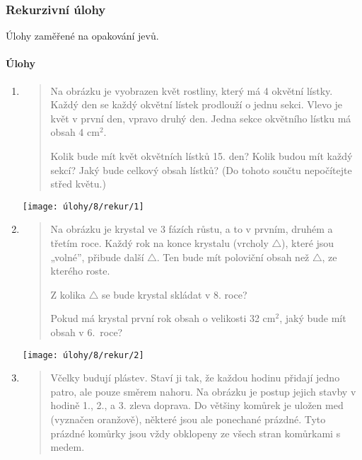 \newpage

\subsubsection{Rekurzivní úlohy}
Úlohy zaměřené na opakování jevů.

\paragraph{Úlohy}
\begin{enumerate}
    \item
    \begin{minipage}[t]{\linewidth}
        \begin{quote}
            Na obrázku je vyobrazen květ rostliny, který má 4 okvětní lístky. Každý den se každý okvětní lístek prodlouží o jednu sekci. Vlevo je květ v první den, vpravo druhý den. Jedna sekce okvětního lístku má obsah 4 cm$^{2}$.

            Kolik bude mít květ okvětních lístků 15. den? Kolik budou mít každý sekcí? Jaký bude celkový obsah lístků? (Do tohoto součtu nepočítejte střed květu.)
        \end{quote}
        \centering
        \texttt{[image: úlohy/8/rekur/1]}
    \end{minipage}

    \item
    \begin{minipage}[t]{\linewidth}
        \begin{quote}
            Na obrázku je krystal ve 3 fázích růstu, a to v prvním, druhém a třetím roce. Každý rok na konce krystalu (vrcholy $\triangle$), které jsou „volné”, přibude další $\triangle$. Ten bude mít poloviční obsah než $\triangle$, ze kterého roste.

            Z kolika $\triangle$ se bude krystal skládat v 8. roce?

            Pokud má krystal první rok obsah o velikosti 32 cm$^{2}$, jaký bude mít obsah v 6.~roce?
        \end{quote}
        \centering
        \texttt{[image: úlohy/8/rekur/2]}
    \end{minipage}

    \item
    \begin{minipage}[t]{\linewidth}
        \begin{quote}
            Včelky budují plástev. Staví ji tak, že každou hodinu přidají jedno patro, ale pouze směrem nahoru. Na obrázku je postup jejich stavby v hodině 1., 2., a 3. zleva doprava. Do většiny komůrek je uložen med (vyznačen oranžově), některé jsou ale ponechané prázdné. Tyto prázdné komůrky jsou vždy obklopeny ze všech stran komůrkami s medem.


\end{quote}
\end{minipage}
\end{enumerate}
